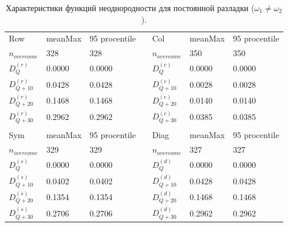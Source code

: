 \documentclass[specialist, substylefile = spbu.rtx,
			   subf, href, 12pt]{disser}
\begin{document}
\newpage
\begin{table}[!hhh]
	\caption{Характеристики функций неоднородности для постоянной разладки ($\omega_1 \neq \omega_2$).}
	\begin{tabular}{lllllll}
		Row & meanMax & 95 procentile &  & Col & meanMax & 95 procentile \\
		$n_{overcome}$ & 328 & 328 &  & $n_{overcome}$ & 350 & 350 \\
		$D_Q^{(r)}$ & 0.0000 & 0.0000 &  & $D_Q^{(c)}$ & 0.0000 & 0.0000 \\
		$D_{Q+10}^{(r)}$ & 0.0428 & 0.0428 &  & $D_{Q+10}^{(c)}$ & 0.0028 & 0.0028 \\
		$D_{Q+20}^{(r)}$ & 0.1468 & 0.1468 &  & $D_{Q+20}^{(c)}$ & 0.0140 & 0.0140 \\
		$D_{Q+30}^{(r)}$ & 0.2962 & 0.2962 &  & $D_{Q+30}^{(c)}$ & 0.0385 & 0.0385 \\
		&  &  &  &  &  &  \\
		Sym & meanMax & 95 procentile &  & Diag & meanMax & 95 procentile \\
		$n_{overcome}$ & 329 & 329 &  & $n_{overcome}$ & 327 & 327 \\
		$D_Q^{(s)}$ & 0.0000 & 0.0000 &  & $D_Q^{(d)}$ & 0.0000 & 0.0000 \\
		$D_{Q+10}^{(s)}$ & 0.0402 & 0.0402 &  & $D_{Q+10}^{(d)}$ & 0.0428 & 0.0428 \\
		$D_{Q+20}^{(s)}$ & 0.1354 & 0.1354 &  & $D_{Q+20}^{(d)}$ & 0.1468 & 0.1468 \\
		$D_{Q+30}^{(s)}$ & 0.2706 & 0.2706 &  & $D_{Q+30}^{(d)}$ & 0.2962 & 0.2962
	\end{tabular}
	\label{tab:PermanentHeterogeneity}
\end{table}
\end{document}

